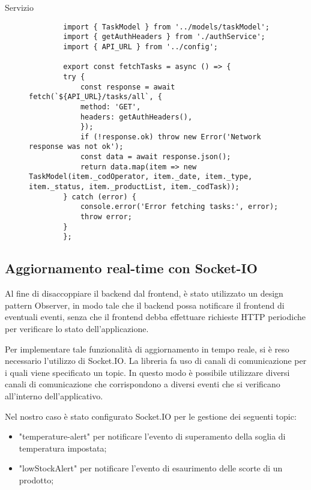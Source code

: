 Servizio
\begin{figure}[H]
    \centering
    \begin{verbatim}
        import { TaskModel } from '../models/taskModel';
        import { getAuthHeaders } from './authService';
        import { API_URL } from '../config';

        export const fetchTasks = async () => {
        try {
            const response = await fetch(`${API_URL}/tasks/all`, {
            method: 'GET',
            headers: getAuthHeaders(),
            });
            if (!response.ok) throw new Error('Network response was not ok');
            const data = await response.json();
            return data.map(item => new TaskModel(item._codOperator, item._date, item._type, item._status, item._productList, item._codTask));
        } catch (error) {
            console.error('Error fetching tasks:', error);
            throw error;
        }
        };

\end{verbatim}
\end{figure}

\subsection{Aggiornamento real-time con Socket-IO}
Al fine di disaccoppiare il backend dal frontend, è stato utilizzato un design pattern Observer, in modo tale che il backend possa notificare il frontend di eventuali eventi, senza che il frontend debba effettuare richieste HTTP periodiche per verificare lo stato dell'applicazione.

Per implementare tale funzionalità di aggiornamento in tempo reale, si è reso necessario l'utilizzo di Socket.IO. 
La libreria fa uso di canali di comunicazione per i quali viene specificato un topic. 
In questo modo è possibile utilizzare diversi canali di comunicazione che corrispondono a diversi eventi che si verificano all'interno dell'applicativo. 

Nel nostro caso è stato configurato Socket.IO per le gestione dei seguenti topic:
\begin{itemize}
  \item "temperature-alert" per notificare l'evento di superamento della soglia di temperatura impostata;
  \item "lowStockAlert" per notificare l'evento di esaurimento delle scorte di un prodotto;
\end{itemize}


